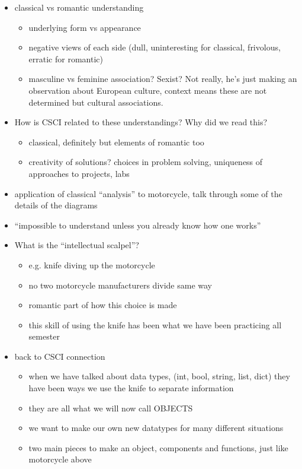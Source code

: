 \documentclass{article}
\begin{document}
\begin{itemize}
\item classical vs romantic understanding
  \begin{itemize}
  \item underlying form vs appearance
  \item negative views of each side (dull, uninteresting for
    classical, frivolous, erratic for romantic)
  \item masculine vs feminine association? Sexist?  Not really, he's
    just making an observation about European culture, context means
    these are not determined but cultural associations.
  \end{itemize}
\item How is CSCI related to these understandings? Why did we read
  this?
  \begin{itemize}
  \item classical, definitely but elements of romantic too
  \item creativity of solutions?  choices in problem solving, uniqueness
    of approaches to projects, labs
  \end{itemize}
\item application of classical ``analysis'' to motorcycle, talk through
  some of the details of the diagrams
\item ``impossible to understand unless you already know how one works''
\item What is the ``intellectual scalpel''?
  \begin{itemize}
  \item e.g. knife diving up the motorcycle
  \item no two motorcycle manufacturers divide same way
  \item romantic part of how this choice is made
  \item this skill of using the knife has been what we have been
    practicing all semester
  \end{itemize}
\item back to CSCI connection
  \begin{itemize}
  \item when we have talked about data types, (int, bool, string, list, dict)
    they have been ways we use the knife to separate information
  \item they are all what we will now call OBJECTS
  \item we want to make our own new datatypes for many different situations
  \item two main pieces to make an object, components and functions, just like motorcycle above

\end{itemize}
\end{itemize}
\end{document}
